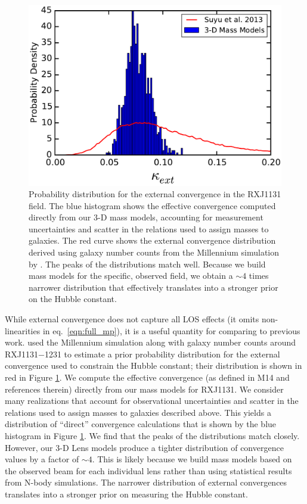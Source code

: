 \documentclass{emulateapj}
\begin{document}
\begin{figure}[t]
\begin{center}
\includegraphics[width=\columnwidth]{suyu_kappa.pdf}
\caption{\label{fig:kappa} Probability distribution for the external convergence in the RXJ1131 field. The blue histogram shows the effective convergence computed directly from our 3-D mass models, accounting for measurement uncertainties and scatter in the relations used to assign masses to galaxies. The red curve shows the external convergence distribution derived using galaxy number counts from the Millennium simulation by \citet{Suyu13}. The peaks of the distributions match well. Because we build mass models for the specific, observed field, we obtain a $\sim 4$ times narrower distribution that effectively translates into a stronger prior on the Hubble constant.%
}
\end{center}
\end{figure}

While external convergence does not capture all LOS effects (it omits non-linearities in eq.\ \ref{eqn:full_mp}), it is a useful quantity for comparing to previous work. \citet{Suyu13} used the Millennium simulation along with galaxy number counts around RXJ1131$-$1231 \citep[][hereafter RXJ1131]{Sluse03} to estimate a prior probability distribution for the external convergence used to constrain the Hubble constant; their distribution is shown in red in Figure \ref{fig:kappa}. We compute the effective convergence (as defined in M14 and references therein) directly from our mass models for RXJ1131.  We consider many realizations that account for observational uncertainties and scatter in the relations used to assign masses to galaxies described above.  This yields a distribution of ``direct'' convergence calculations that is shown by the blue histogram in Figure \ref{fig:kappa}. We find that the peaks of the distributions match closely. However, our 3-D Lens models produce a tighter distribution of convergence values by a factor of $\sim 4$. This is likely because we build mass models based on the observed beam for each individual lens rather than using statistical results from N-body simulations. The narrower distribution of external convergences translates into a stronger prior on measuring the Hubble constant.
\end{document}

